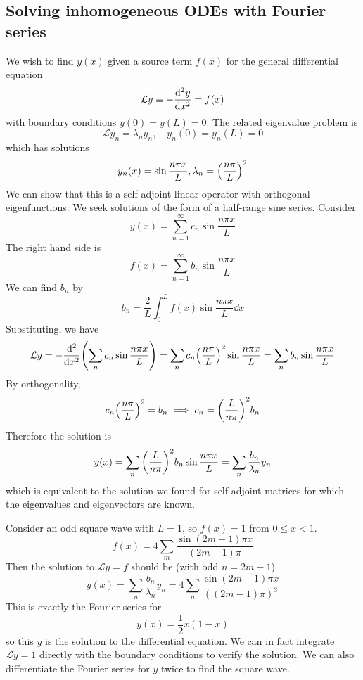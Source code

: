 \subsection{Solving inhomogeneous ODEs with Fourier series}
We wish to find \( y(x) \) given a source term \( f(x) \) for the general differential equation
\[
	\mathcal L y \equiv -\dv[2]{y}{x} = f(x)
\]
with boundary conditions \( y(0) = y(L) = 0 \).
The related eigenvalue problem is
\[
	\mathcal L y_n = \lambda_n y_n,\quad y_n(0) = y_n(L) = 0
\]
which has solutions
\[
	y_n(x) = \sin \frac{n \pi x}{L}, \lambda_n = \qty(\frac{n\pi}{L})^2
\]
We can show that this is a self-adjoint linear operator with orthogonal eigenfunctions.
We seek solutions of the form of a half-range sine series.
Consider
\[
	y(x) = \sum_{n=1}^\infty c_n \sin\frac{n \pi x}{L}
\]
The right hand side is
\[
	f(x) = \sum_{n=1}^\infty b_n \sin \frac{n \pi x}{L}
\]
We can find \( b_n \) by
\[
	b_n = \frac{2}{L} \int_0^L f(x) \sin \frac{n \pi x}{L} \dd{x}
\]
Substituting, we have
\[
	\mathcal L y = -\dv[2]{x} \qty(\sum_n c_n \sin \frac{n \pi x}{L}) = \sum_n c_n \qty(\frac{n\pi}{L})^2 \sin \frac{n \pi x}{L} = \sum_n b_n \sin \frac{n \pi x}{L}
\]
By orthogonality,
\[
	c_n \qty(\frac{n \pi}{L})^2 = b_n \implies c_n = \qty(\frac{L}{n \pi})^2 b_n
\]
Therefore the solution is
\[
	y(x) = \sum_n \qty(\frac{L}{n \pi})^2 b_n \sin \frac{n \pi x}{L} = \sum_n \frac{b_n}{\lambda_n} y_n
\]
which is equivalent to the solution we found for self-adjoint matrices for which the eigenvalues and eigenvectors are known.
\begin{example}
	Consider an odd square wave with \( L = 1 \), so \( f(x) = 1 \) from \( 0 \leq x < 1 \).
	\[
		f(x) = 4 \sum_m \frac{\sin(2m-1)\pi x}{(2m-1)\pi}
	\]
	Then the solution to \( \mathcal L y = f \) should be (with odd \( n = 2m-1 \))
	\[
		y(x) = \sum_n \frac{b_n}{\lambda_n} y_n = 4 \sum_n \frac{\sin (2m-1) \pi x}{((2m - 1) \pi)^3}
	\]
	This is exactly the Fourier series for
	\[
		y(x) = \frac{1}{2}x(1-x)
	\]
	so this \( y \) is the solution to the differential equation.
	We can in fact integrate \( \mathcal L y = 1 \) directly with the boundary conditions to verify the solution.
	We can also differentiate the Fourier series for \( y \) twice to find the square wave.
\end{example}
